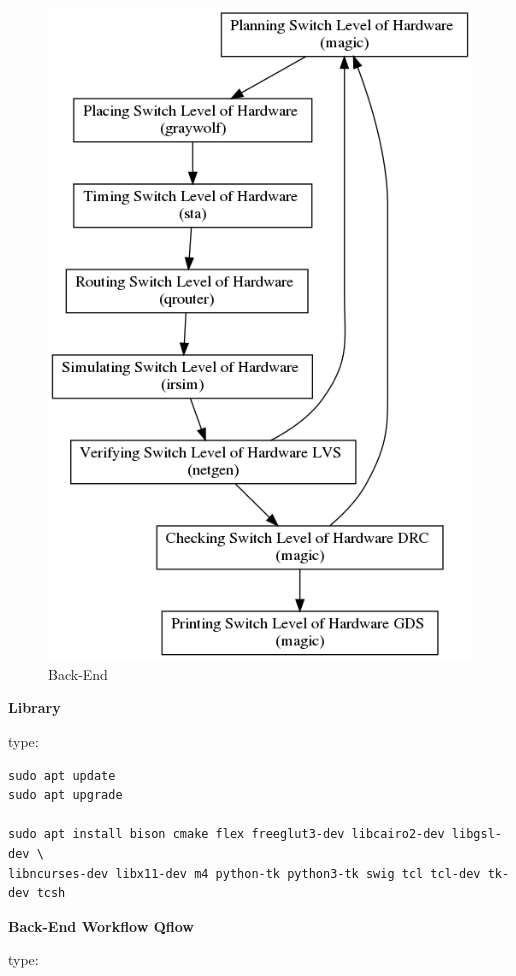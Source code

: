 \documentclass[]{article}
\begin{document}
\begin{figure}
\centering
\includegraphics{../doc/back-end.png}
\caption{Back-End}
\end{figure}

\textbf{Library}

type:

\begin{verbatim}
sudo apt update
sudo apt upgrade

sudo apt install bison cmake flex freeglut3-dev libcairo2-dev libgsl-dev \
libncurses-dev libx11-dev m4 python-tk python3-tk swig tcl tcl-dev tk-dev tcsh
\end{verbatim}

\textbf{Back-End Workflow Qflow}

type:
\end{document}
